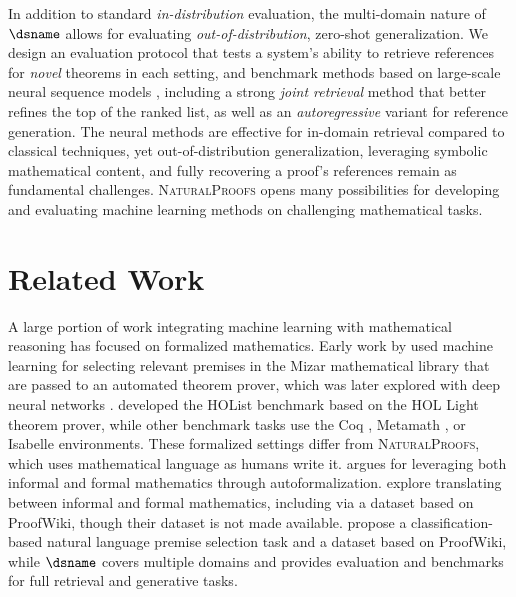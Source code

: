 In addition to standard \textit{in-distribution} evaluation, the multi-domain nature of $\dsname$ allows for evaluating \textit{out-of-distribution}, zero-shot generalization. 
We design an evaluation protocol that tests a system's ability to retrieve references for \textit{novel} theorems in each setting, and benchmark methods based on large-scale neural sequence models \citep{devlin2019bert,karpukhin2020dense}, including a strong \textit{joint retrieval} method that better refines the top of the ranked list, 
as well as an \textit{autoregressive} variant for reference generation.
The neural methods are effective for in-domain retrieval compared to classical techniques,
yet out-of-distribution generalization, 
leveraging symbolic mathematical content, and fully recovering a proof's references remain as fundamental challenges.
\textsc{NaturalProofs} opens many possibilities for developing and evaluating machine learning methods on challenging mathematical tasks.

\section{Related Work}
\label{sec:related-work}

A large portion of work integrating machine learning with mathematical reasoning has focused on formalized mathematics.
Early work by \citet{urban2006mptp} used machine learning for selecting relevant premises in the Mizar mathematical library that are passed to an automated theorem prover,
which was later explored with deep neural networks \citep{alemi2016deepmath}.
\citet{bansal2019holist} developed the HOList benchmark based on the HOL Light theorem prover, while other benchmark tasks use the Coq \citep{huang2019gamepad,yang2019learning}, Metamath \citep{whalen2016holophrasm,wang2020learning,polu2020generative}, or Isabelle \citep{li2021isarstep} environments.
These formalized settings differ from \textsc{NaturalProofs}, which uses mathematical language as humans write it.
\citet{szegedy2020promising} argues for leveraging both informal and formal mathematics through autoformalization.
\citet{wang2020exploration} explore translating between informal and formal mathematics, including via a dataset based on ProofWiki, though their dataset is not made available.
\citet{ferreira2020natural,ferreira2020premise} propose a classification-based natural language premise selection task and a dataset based on ProofWiki, while $\dsname$ covers multiple domains and provides evaluation and benchmarks for full retrieval and generative tasks.

